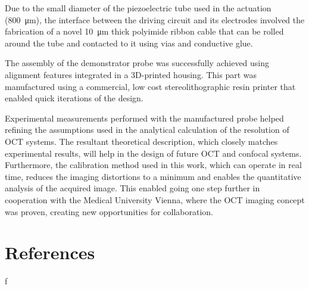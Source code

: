 \documentclass[10pt]{iopart}
\begin{document}
Due to the small diameter of the piezoelectric tube used in the actuation (\SI{800}{\micro\meter}), the interface between the driving circuit and its electrodes involved the fabrication of a novel \SI{10}{\micro\meter} thick polyimide ribbon cable that can be rolled around the tube and contacted to it using vias and conductive glue.

The assembly of the demonstrator probe was successfully achieved using alignment features integrated in a 3D-printed housing. This part was manufactured using a commercial, low cost stereolithographic resin printer that enabled quick iterations of the design. 

Experimental measurements performed with the manufactured probe helped refining the assumptions used in the analytical calculation of the resolution of OCT systems. The resultant theoretical description, which closely matches experimental results, will help in the design of future OCT and confocal systems. Furthermore, the calibration method used in this work, which can operate in real time, reduces the imaging distortions to a minimum and enables the quantitative analysis of the acquired image. This enabled going one step further in cooperation with the Medical University Vienna, where the OCT imaging concept was proven, creating new opportunities for collaboration. 

\section*{References}


f



\end{document}
